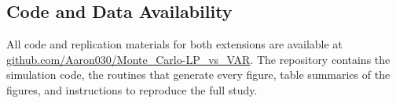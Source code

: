 
\subsection{Code and Data Availability}

All code and replication materials for both extensions are available at
\href{https://github.com/Aaron030/Monte_Carlo-LP_vs_VAR}{github.com/Aaron030/Monte\_Carlo-LP\_vs\_VAR}.
The repository contains the simulation code, the routines that generate every figure, table summaries of the figures,
and instructions to reproduce the full study.
